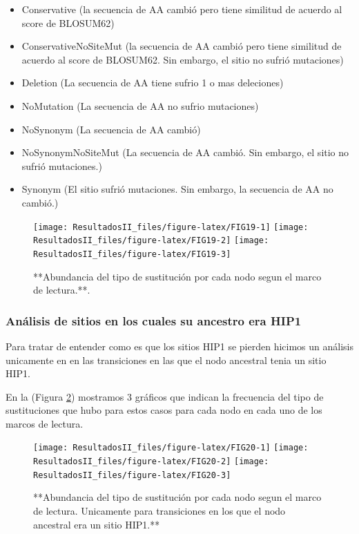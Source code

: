 \documentclass[
]{book}
\providecommand{\tightlist}{%
  \setlength{\itemsep}{0pt}\setlength{\parskip}{0pt}}
\begin{document}
\begin{itemize}
\tightlist
\item
  Conservative (la secuencia de AA cambió pero tiene similitud de acuerdo al score de BLOSUM62)
\item
  ConservativeNoSiteMut (la secuencia de AA cambió pero tiene similitud de acuerdo al score de BLOSUM62. Sin embargo, el sitio no sufrió mutaciones)
\item
  Deletion (La secuencia de AA tiene sufrio 1 o mas deleciones)
\item
  NoMutation (La secuencia de AA no sufrio mutaciones)
\item
  NoSynonym (La secuencia de AA cambió)
\item
  NoSynonymNoSiteMut (La secuencia de AA cambió. Sin embargo, el sitio no sufrió mutaciones.)
\item
  Synonym (El sitio sufrió mutaciones. Sin embargo, la secuencia de AA no cambió.)
\end{itemize}

\begin{figure}

{\centering \texttt{[image: ResultadosII\_files/figure-latex/FIG19-1]} \texttt{[image: ResultadosII\_files/figure-latex/FIG19-2]} \texttt{[image: ResultadosII\_files/figure-latex/FIG19-3]} 

}

\caption{**Abundancia del tipo de sustitución por cada nodo segun el marco de lectura.**.}\label{fig:FIG19}
\end{figure}

\hypertarget{anuxe1lisis-de-sitios-en-los-cuales-su-ancestro-era-hip1}{%
\subsubsection{Análisis de sitios en los cuales su ancestro era HIP1}\label{anuxe1lisis-de-sitios-en-los-cuales-su-ancestro-era-hip1}}

Para tratar de entender como es que los sitios HIP1 se pierden hicimos un análisis unicamente en en las transiciones en las que el nodo ancestral tenia un sitio HIP1.

En la (Figura \ref{fig:FIG20}) mostramos 3 gráficos que indican la frecuencia del tipo de sustituciones que hubo para estos casos para cada nodo en cada uno de los marcos de lectura.

\begin{figure}

{\centering \texttt{[image: ResultadosII\_files/figure-latex/FIG20-1]} \texttt{[image: ResultadosII\_files/figure-latex/FIG20-2]} \texttt{[image: ResultadosII\_files/figure-latex/FIG20-3]} 

}

\caption{**Abundancia del tipo de sustitución por cada nodo segun el marco de lectura. Unicamente para transiciones en los que el nodo ancestral era un sitio HIP1.**}\label{fig:FIG20}
\end{figure}
\end{document}
